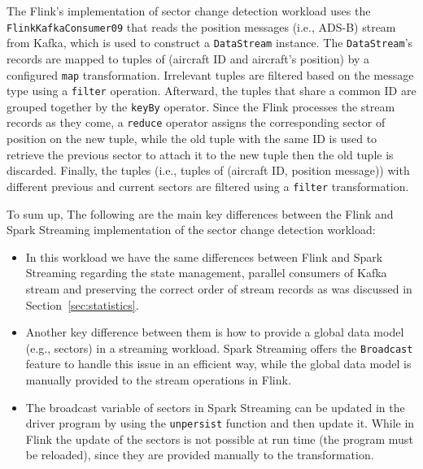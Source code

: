 \documentclass[]{article}
\begin{document}
\begin{itemize}
 The Flink's implementation of sector change detection workload uses the \texttt{FlinkKafkaConsumer09} that reads the position messages (i.e., ADS-B) stream from Kafka, which is used to construct a \texttt{DataStream} instance. The \texttt{DataStream}'s records are mapped to tuples of (aircraft ID and aircraft's position) by a configured \texttt{map} transformation. Irrelevant tuples are filtered based on the message type using a \texttt{filter} operation. Afterward, the tuples that share a common ID are grouped together by the \texttt{keyBy} operator. Since the Flink processes the stream records as they come, a \texttt{reduce} operator assigns the corresponding sector of position on the new tuple, while the old tuple with the same ID is used to retrieve the previous sector to attach it to the new tuple then the old tuple is discarded. Finally, the tuples (i.e., tuples of (aircraft ID, position message)) with different previous and current sectors are filtered using a \texttt{filter} transformation.

 \end{itemize}
 
 
 \par To sum up, The following are the main key differences between the Flink and Spark Streaming implementation of the sector change detection workload:
 
 
 \begin{itemize}
 \item  In this workload we have the  same differences between Flink and Spark Streaming regarding the state management, parallel  consumers of Kafka stream and preserving the correct order of stream records as was discussed in Section~\ref{sec:statistics}.
 \item Another key difference between them is how  to provide a global data model (e.g., sectors) in a streaming workload. Spark Streaming offers the \texttt{Broadcast} feature to handle this issue in an efficient way, while the global data model is manually provided  to the stream operations in Flink. 
 \item The broadcast variable of sectors in Spark Streaming can be updated in the driver program by using the \texttt{unpersist} function and then update it. While in Flink the update of the sectors is not possible at run time (the program must be reloaded), since they are provided manually to the transformation.  
 \end{itemize}
 
 
\end{document}

